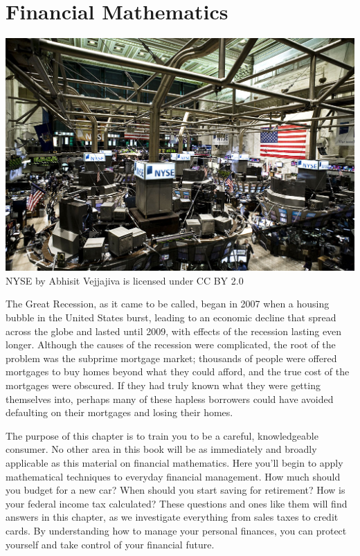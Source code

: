 \documentclass[9pt,letter,twoside,openright]{memoir}
\begin{document}
\frontmatter
{}
\pagestyle{empty}
\titleBC
\frontmatter


\vfill
\pagebreak

\setcounter{tocdepth}{1}
\tableofcontents*
\mainmatter
\restoregeometry
\pagestyle{doc}

\chapter{Financial Mathematics}
\begin{center}
\includegraphics[width=\textwidth]{NYSE2}\\
\text{} \hfill {\color{gray} NYSE by Abhisit Vejjajiva is licensed under CC BY 2.0}
\end{center}
\vfill

The Great Recession, as it came to be called, began in 2007 when a housing bubble in the United States burst, leading to an economic decline that spread across the globe and lasted until 2009, with effects of the recession lasting even longer.  Although the causes of the recession were complicated, the root of the problem was the subprime mortgage market; thousands of people were offered mortgages to buy homes beyond what they could afford, and the true cost of the mortgages were obscured.  If they had truly known what they were getting themselves into, perhaps many of these hapless borrowers could have avoided defaulting on their mortgages and losing their homes.

The purpose of this chapter is to train you to be a careful, knowledgeable consumer.  No other area in this book will be as immediately and broadly applicable as this material on financial mathematics.  Here you'll begin to apply mathematical techniques to everyday financial management.  How much should you budget for a new car?  When should you start saving for retirement?  How is your federal income tax calculated?  These questions and ones like them will find answers in this chapter, as we investigate everything from sales taxes to credit cards.  By understanding how to manage your personal finances, you can protect yourself and take control of your financial future.
\vfill
\pagebreak
\end{document}

